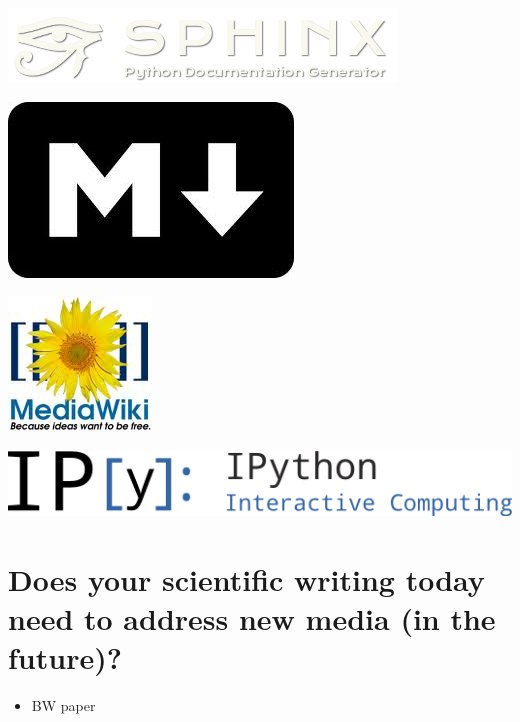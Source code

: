 \documentclass[%
twoside,                 %
draft,                   %
final,                   %
chapterprefix=true,      %
open=right               %
10pt]{book}
\begin{document}
\begin{shadedquoteBlue}
\begin{center}  %
  \centerline{\includegraphics[width=0.4\linewidth]{fig/sphinx_logo.png}}
\end{center}



\begin{center}  %
  \centerline{\includegraphics[width=0.2\linewidth]{fig/markdown_logo.jpg}}
\end{center}



\begin{center}  %
  \centerline{\includegraphics[width=0.2\linewidth]{fig/MediaWiki_logo.jpg}}
\end{center}



\begin{center}  %
  \centerline{\includegraphics[width=0.6\linewidth]{fig/IPython_logo.png}}
\end{center}


\section*{Does your scientific writing today need to address new media (in the future)?}


\begin{itemize}
 \item BW paper


\end{itemize}
\end{shadedquoteBlue}
\end{document}
